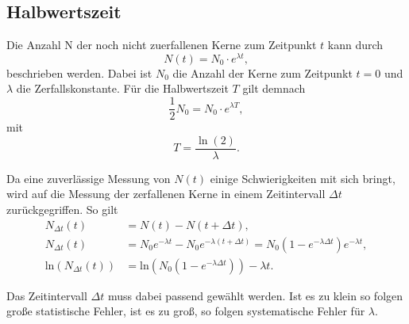 \subsection{Halbwertszeit}
Die Anzahl N der noch nicht zuerfallenen Kerne zum Zeitpunkt $t$ kann durch
\begin{equation}
    N(t)=N_0\cdot e^{\lambda t},
\end{equation}
beschrieben werden. 
Dabei ist $N_0$ die Anzahl der Kerne zum Zeitpunkt $t=0$ und $\lambda$ 
die Zerfallskonstante. 
Für die Halbwertszeit $T$ gilt demnach
\begin{equation}
    \frac{1}{2}N_0=N_0\cdot e^{\lambda T},
\end{equation}
mit
\begin{equation}
    T=\frac{\ln(2)}{\lambda}.
\end{equation}

Da eine zuverlässige Messung von $N(t)$ einige Schwierigkeiten mit sich bringt, 
wird auf die Messung der zerfallenen Kerne in einem Zeitintervall $\Delta t$ zurückgegriffen.
So gilt
\begin{align}
    N_{\Delta t}(t)&=N(t)-N(t+\Delta t),\\
    N_{\Delta t}(t)&=N_0e^{-\lambda t}-N_0e^{-\lambda(t+\Delta t)}=N_0(1-e^{-\lambda\Delta t})e^{-\lambda t},\\
    \text{ln}(N_{\Delta t}(t))&=\text{ln}\left(N_0(1-e^{-\lambda\Delta t})\right)-\lambda t. \label{eqn:Zerfallsgesetz}
\end{align}

Das Zeitintervall $\Delta t$ muss dabei passend gewählt werden. 
Ist es zu klein so folgen große statistische Fehler, ist es zu groß, 
so folgen systematische Fehler für $\lambda$.
\label{subsec:halbwertszeit}